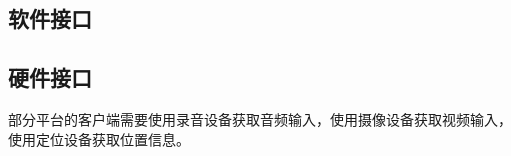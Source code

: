 \subsection{软件接口}
% 
% 
% 
% 
% 
% 
% 


\subsection{硬件接口}
% 
% 
% 
% 
%  

部分平台的客户端需要使用录音设备获取音频输入，使用摄像设备获取视频输入，使用定位设备获取位置信息。

